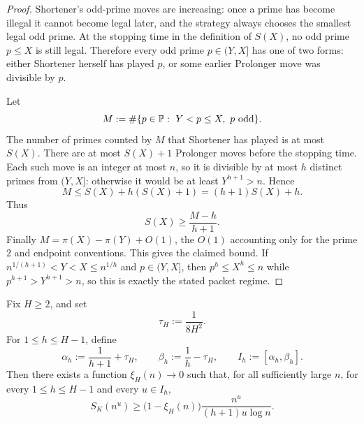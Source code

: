 \begin{proof}
Shortener's odd-prime moves are increasing: once a prime has become illegal it
cannot become legal later, and the strategy always chooses the smallest legal
odd prime.  At the stopping time in the definition of $S(X)$, no odd prime
$p\le X$ is still legal.  Therefore every odd prime $p\in(Y,X]$ has one of two
forms: either Shortener herself has played $p$, or some earlier Prolonger move
was divisible by $p$.

Let
\[
  M:=\#\{p\in\PP:\ Y<p\le X,\ p\text{ odd}\}.
\]
The number of primes counted by $M$ that Shortener has played is at most
$S(X)$.  There are at most $S(X)+1$ Prolonger moves before the stopping time.
Each such move is an integer at most $n$, so it is divisible by at most $h$
distinct primes from $(Y,X]$: otherwise it would be at least
$Y^{h+1}>n$.  Hence
\[
  M\le S(X)+h(S(X)+1)=(h+1)S(X)+h.
\]
Thus
\[
  S(X)\ge \frac{M-h}{h+1}.
\]
Finally $M=\pi(X)-\pi(Y)+O(1)$, the $O(1)$ accounting only for the prime $2$
and endpoint conventions.  This gives the claimed bound.  If
$n^{1/(h+1)}<Y<X\le n^{1/h}$ and $p\in(Y,X]$, then $p^h\le X^h\le n$ while
$p^{h+1}>Y^{h+1}>n$, so this is exactly the stated packet regime.
\end{proof}

\begin{proposition}\label{prop:local-density}
Fix $H\ge 2$, and set
\[
  \tau_H := \frac{1}{8H^2}.
\]
For $1\le h\le H-1$, define
\[
  \alpha_h := \frac{1}{h+1}+\tau_H,
  \qquad
  \beta_h := \frac1h-\tau_H,
  \qquad
  I_h := [\alpha_h,\beta_h].
\]
Then there exists a function $\xi_H(n)\to 0$ such that, for all sufficiently
large $n$, for every $1\le h\le H-1$ and every $u\in I_h$,
\[
  S_K(n^u)
  \ge
  \bigl(1-\xi_H(n)\bigr)\frac{n^u}{(h+1)u\log n}.
\]
\end{proposition}


